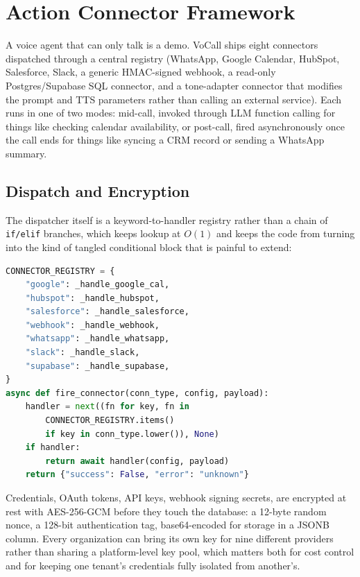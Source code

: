 \documentclass[conference]{IEEEtran}
\begin{document}
\section{Action Connector Framework}
\label{sec:connectors}

A voice agent that can only talk is a demo. VoCall ships eight connectors dispatched through a central registry (WhatsApp, Google Calendar, HubSpot, Salesforce, Slack, a generic HMAC-signed webhook, a read-only Postgres/Supabase SQL connector, and a tone-adapter connector that modifies the prompt and TTS parameters rather than calling an external service). Each runs in one of two modes: mid-call, invoked through LLM function calling for things like checking calendar availability, or post-call, fired asynchronously once the call ends for things like syncing a CRM record or sending a WhatsApp summary.

\subsection{Dispatch and Encryption}

The dispatcher itself is a keyword-to-handler registry rather than a chain of \texttt{if/elif} branches, which keeps lookup at $O(1)$ and keeps the code from turning into the kind of tangled conditional block that is painful to extend:

\begin{lstlisting}[language=Python]
CONNECTOR_REGISTRY = {
    "google": _handle_google_cal,
    "hubspot": _handle_hubspot,
    "salesforce": _handle_salesforce,
    "webhook": _handle_webhook,
    "whatsapp": _handle_whatsapp,
    "slack": _handle_slack,
    "supabase": _handle_supabase,
}
async def fire_connector(conn_type, config, payload):
    handler = next((fn for key, fn in
        CONNECTOR_REGISTRY.items()
        if key in conn_type.lower()), None)
    if handler:
        return await handler(config, payload)
    return {"success": False, "error": "unknown"}
\end{lstlisting}

Credentials, OAuth tokens, API keys, webhook signing secrets, are encrypted at rest with AES-256-GCM before they touch the database: a 12-byte random nonce, a 128-bit authentication tag, base64-encoded for storage in a JSONB column. Every organization can bring its own key for nine different providers rather than sharing a platform-level key pool, which matters both for cost control and for keeping one tenant's credentials fully isolated from another's.
\end{document}
